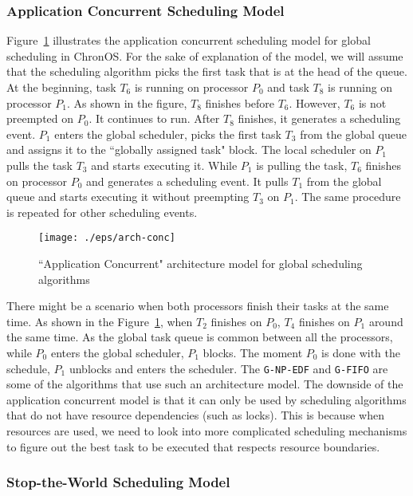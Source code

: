 \documentclass[12pt,dvips]{report}
\begin{document}
\subsubsection{Application Concurrent Scheduling Model}\label{sec:concurrent}

Figure~\ref{fig:arch-conc} illustrates the application concurrent scheduling model for global scheduling in ChronOS. For the sake of explanation of the model, we will assume that the scheduling algorithm picks the first task that is at the head of the queue. At the beginning, task $T_6$ is running on processor $P_0$ and task $T_8$ is running on processor $P_1$. As shown in the figure, $T_8$ finishes before  $T_6$. However, $T_6$ is not preempted on $P_0$. It continues to run. After $T_8$ finishes, it generates a scheduling event. $P_1$ enters the global scheduler, picks the first task $T_3$ from the global queue and assigns it to the ``globally assigned task" block. The local scheduler on $P_1$ pulls the task $T_3$ and starts executing it. While $P_1$ is pulling the task, $T_6$ finishes on processor $P_0$ and generates a scheduling event. It pulls $T_1$ from the global queue and starts executing it without preempting $T_3$ on $P_1$. The same procedure is repeated for other scheduling events.

\begin{figure} [htb]
  \centering
  \texttt{[image: ./eps/arch-conc]}
  \caption{``Application Concurrent" architecture model for global scheduling algorithms}
  \label{fig:arch-conc}
\end{figure}

There might be a scenario when both processors finish their tasks at the same time. As shown in the Figure~\ref{fig:arch-conc}, when $T_2$ finishes on $P_0$, $T_4$ finishes on $P_1$ around the same time. As the global task queue is common between all the processors, while $P_0$ enters the global scheduler, $P_1$ blocks. The moment $P_0$ is done with the schedule, $P_1$ unblocks and enters the scheduler. The \texttt{G-NP-EDF} and \texttt{G-FIFO} are some of the algorithms that use such an architecture model. The downside of the application concurrent model is that it can only be used by scheduling algorithms that do not have resource dependencies (such as locks). This is because when resources are used, we need to look into more complicated scheduling mechanisms to figure out the best task to be executed that respects resource boundaries.

\subsubsection{Stop-the-World Scheduling Model}\label{sec:stw}
\end{document}
